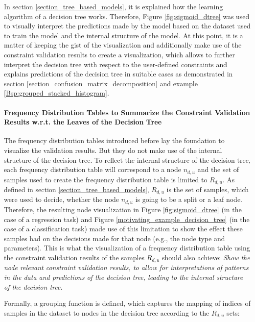 In section \ref{section_tree_based_models}, it is explained how the learning algorithm of a decision tree works. Therefore, Figure \ref{fig:sigmoid_dtree} was used to visually interpret the predictions made by the model based on the dataset used to train the model and the internal structure of the model. At this point, it is a matter of keeping the gist of the visualization and additionally make use of the constraint validation results to create a visualization, which allows to further interpret the decision tree with respect to the user-defined constraints and explains predictions of the decision tree in suitable cases as demonstrated in section \ref{section_confusion_matrix_decomposition} and example \ref{Bsp:grouped_stacked_histogram}.

\paragraph{Frequency Distribution Tables to Summarize the Constraint Validation Results w.r.t. the Leaves of the Decision Tree} 

The frequency distribution tables introduced before lay the foundation to visualize the validation results. But they do not make use of the internal structure of the decision tree. To reflect the internal structure of the decision tree, each frequency distribution table will correspond to a node $n_{d,u}$ and the set of samples used to create the frequency distribution table is limited to $R_{d,u}$. As defined in section \ref{section_tree_based_models}, $R_{d,u}$ is the set of samples, which were used to decide, whether the node $n_{d,u}$ is going to be a split or a leaf node. Therefore, the resulting node visualization in Figure \ref{fig:sigmoid_dtree} (in the case of a regression task) and Figure \ref{motivating_example_decision_tree} (in the case of a classification task) made use of this limitation to show the effect these samples had on the decisions made for that node (e.g., the node type and parameters). This is what the visualization of a frequency distribution table using the constraint validation results of the samples $R_{d,u}$ should also achieve: \emph{Show the node relevant constraint validation results, to allow for interpretations of patterns in the data and predictions of the decision tree, leading to the internal structure of the decision tree}.

Formally, a grouping function is defined, which captures the mapping of indices of samples in the dataset to nodes in the decision tree according to the $R_{d,u}$ sets:

